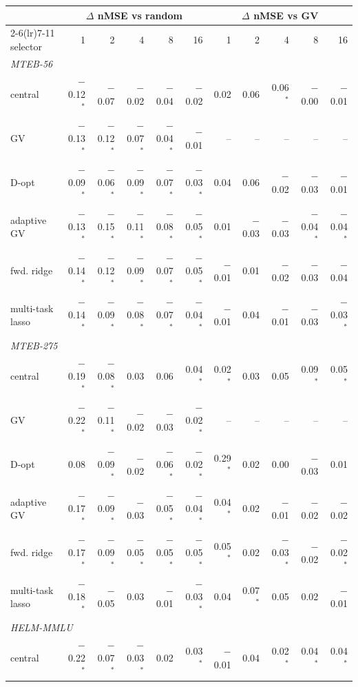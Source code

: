 \begin{tabular}{lrrrrrrrrrr}
\toprule
 & \multicolumn{5}{c}{$\Delta$ nMSE vs random} & \multicolumn{5}{c}{$\Delta$ nMSE vs GV} \\
\cmidrule(lr){2-6}\cmidrule(lr){7-11}
selector & 1 & 2 & 4 & 8 & 16 & 1 & 2 & 4 & 8 & 16 \\
\midrule
\multicolumn{11}{l}{\emph{MTEB-56}} \\
central & $-$0.12$^*$ & $-$0.07 & $-$0.02 & $-$0.04 & $-$0.02 & 0.02 & 0.06 & 0.06$^*$ & $-$0.00 & $-$0.01 \\
GV & $-$0.13$^*$ & $-$0.12$^*$ & $-$0.07$^*$ & $-$0.04$^*$ & $-$0.01 & -- & -- & -- & -- & -- \\
D-opt & $-$0.09$^*$ & $-$0.06$^*$ & $-$0.09$^*$ & $-$0.07$^*$ & $-$0.03$^*$ & 0.04 & 0.06 & $-$0.02 & $-$0.03 & $-$0.01 \\
adaptive GV & $-$0.13$^*$ & $-$0.15$^*$ & $-$0.11$^*$ & $-$0.08$^*$ & $-$0.05$^*$ & 0.01 & $-$0.03 & $-$0.03 & $-$0.04$^*$ & $-$0.04$^*$ \\
fwd. ridge & $-$0.14$^*$ & $-$0.12$^*$ & $-$0.09$^*$ & $-$0.07$^*$ & $-$0.05$^*$ & $-$0.01 & 0.01 & $-$0.02 & $-$0.03 & $-$0.04 \\
multi-task lasso & $-$0.14$^*$ & $-$0.09$^*$ & $-$0.08$^*$ & $-$0.07$^*$ & $-$0.04$^*$ & $-$0.01 & 0.04 & $-$0.01 & $-$0.03 & $-$0.03$^*$ \\
\midrule
\multicolumn{11}{l}{\emph{MTEB-275}} \\
central & $-$0.19$^*$ & $-$0.08$^*$ & 0.03 & 0.06 & 0.04$^*$ & 0.02$^*$ & 0.03 & 0.05 & 0.09$^*$ & 0.05$^*$ \\
GV & $-$0.22$^*$ & $-$0.11$^*$ & $-$0.02 & $-$0.03 & $-$0.02$^*$ & -- & -- & -- & -- & -- \\
D-opt & 0.08 & $-$0.09$^*$ & $-$0.02 & $-$0.06$^*$ & $-$0.02$^*$ & 0.29$^*$ & 0.02 & 0.00 & $-$0.03 & 0.01 \\
adaptive GV & $-$0.17$^*$ & $-$0.09$^*$ & $-$0.03 & $-$0.05$^*$ & $-$0.04$^*$ & 0.04$^*$ & 0.02 & $-$0.01 & $-$0.02 & $-$0.02 \\
fwd. ridge & $-$0.17$^*$ & $-$0.09$^*$ & $-$0.05$^*$ & $-$0.05$^*$ & $-$0.05$^*$ & 0.05$^*$ & 0.02 & $-$0.03$^*$ & $-$0.02 & $-$0.02$^*$ \\
multi-task lasso & $-$0.18$^*$ & $-$0.05 & 0.03 & $-$0.01 & $-$0.03$^*$ & 0.04 & 0.07$^*$ & 0.05 & 0.02 & $-$0.01 \\
\midrule
\multicolumn{11}{l}{\emph{HELM-MMLU}} \\
central & $-$0.22$^*$ & $-$0.07$^*$ & $-$0.03$^*$ & 0.02 & 0.03$^*$ & $-$0.01 & 0.04 & 0.02$^*$ & 0.04$^*$ & 0.04$^*$ \\

\end{tabular}
